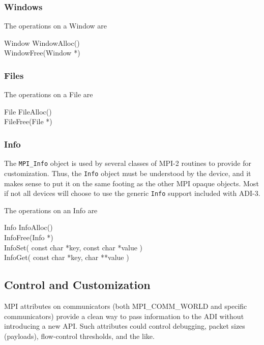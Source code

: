\documentclass{article}
\let\code=\texttt
\begin{document}
\subsubsection{Windows}

The operations on a Window are
\begin{description}
\item[Window WindowAlloc()]
\item[WindowFree(Window *)]
\end{description}


\subsubsection{Files}

The operations on a File are
\begin{description}
\item[File FileAlloc()]
\item[FileFree(File *)]
\end{description}

\subsubsection{Info}
The \code{MPI\_Info} object is used by several classes of MPI-2 routines to
provide for customization.  Thus, the \code{Info} object must be understood by
the device, and it makes sense to put it on the same footing as the other MPI
opaque objects.  Most if not all devices will choose to use the generic
\code{Info} support included with ADI-3.

The operations on an Info are
\begin{description}
\item[Info InfoAlloc()]
\item[InfoFree(Info *)]
\item[InfoSet( const char *key, const char *value )]
\item[InfoGet( const char *key, char **value )]
\end{description}

\subsection{Control and Customization}
MPI attributes on communicators (both MPI\_COMM\_WORLD and specific
communicators) provide a clean way to pass information to the ADI without
introducing a new API.  Such attributes could control debugging, packet sizes
(payloads), flow-control thresholds, and the like.
\end{document}
